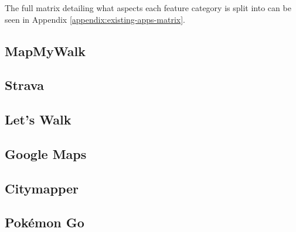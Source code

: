The full matrix detailing what aspects each feature category is split into can be seen in Appendix \ref{appendix:existing-apps-matrix}.


\subsection{MapMyWalk}

\subsection{Strava}

\subsection{Let's Walk}

\subsection{Google Maps}

\subsection{Citymapper}

\subsection{Pok\'{e}mon Go}






%
%
%
%
